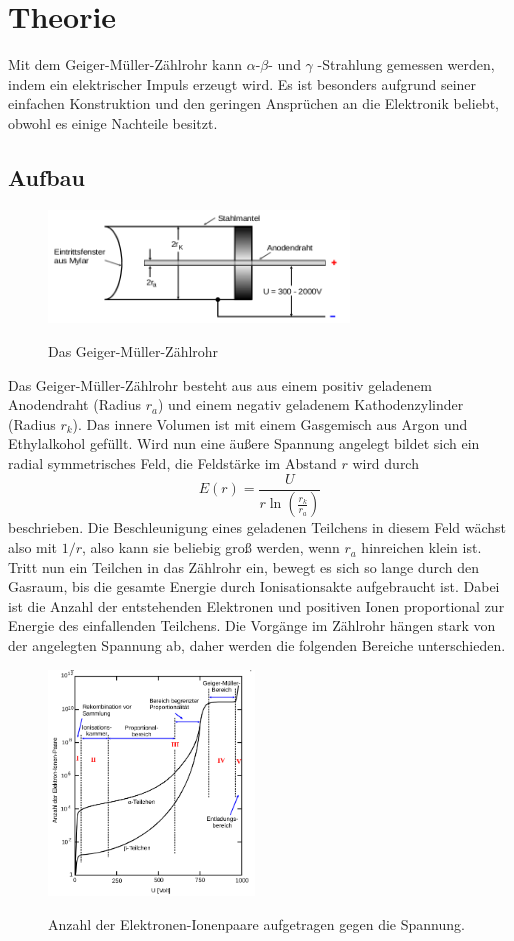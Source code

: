 \section{Theorie}
\label{sec:Theorie}

Mit dem Geiger-Müller-Zählrohr kann $\alpha$-\;$\beta$- und $\gamma$ -Strahlung gemessen
werden, indem ein elektrischer Impuls erzeugt wird. Es ist besonders aufgrund seiner
einfachen Konstruktion und den geringen Ansprüchen an die Elektronik beliebt, obwohl es
einige Nachteile besitzt.

\subsection{Aufbau}


\begin{figure}
  \centering
  \includegraphics[width=8cm]{geiger.png}
  \caption{Das Geiger-Müller-Zählrohr}
  \label{fig:geiger}
  \cite{skript}
\end{figure}
Das Geiger-Müller-Zählrohr besteht aus aus einem positiv geladenem Anodendraht (Radius $r_a$) und
einem negativ geladenem Kathodenzylinder (Radius $r_k$).
Das innere Volumen ist mit einem Gasgemisch aus Argon und
Ethylalkohol gefüllt. Wird nun eine äußere Spannung angelegt bildet sich ein
radial symmetrisches Feld, die Feldstärke im Abstand $r$ wird durch
\begin{equation}
  E(r)=\frac{U}{r\ln(\frac{r_k}{r_a})}
\end{equation}
beschrieben. Die Beschleunigung eines geladenen Teilchens in diesem Feld
wächst also  mit $1/r$, also kann sie beliebig groß werden, wenn $r_a$ hinreichen
klein ist.
Tritt nun ein Teilchen in das Zählrohr ein, bewegt es sich so lange durch den
Gasraum, bis die gesamte Energie durch Ionisationsakte aufgebraucht ist.
Dabei ist die Anzahl der entstehenden Elektronen und positiven Ionen proportional
zur Energie des einfallenden Teilchens.
Die Vorgänge im Zählrohr hängen stark von der angelegten Spannung ab, daher werden
die folgenden Bereiche unterschieden.
\begin{figure}
  \centering
  \includegraphics[height=6cm]{diagramm.png}
  \caption{Anzahl der Elektronen-Ionenpaare aufgetragen gegen die Spannung.}
  \label{fig:diagramm}
  \cite{skript}
\end{figure}

